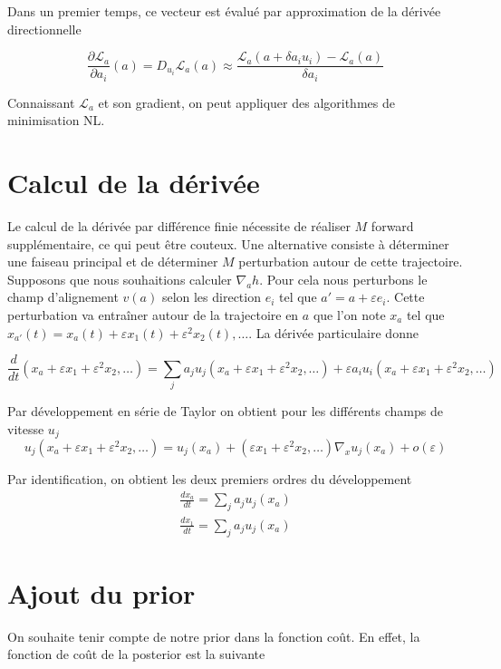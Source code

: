 \documentclass{article}
\begin{document}
Dans un premier temps, ce vecteur est évalué par approximation de la dérivée directionnelle

\begin{equation*}
    \frac{\partial \mathcal L_a}{\partial a_i}(a) = D_{u_i} \mathcal L_a(a) \approx \frac{\mathcal L_a(a + \delta a_i u_i) - \mathcal L_a(a)}{\delta a_i}
\end{equation*}

Connaissant $\mathcal L_a$ et son gradient, on peut appliquer des algorithmes de minimisation NL.

\section{Calcul de la dérivée}

Le calcul de la dérivée par différence finie nécessite de réaliser $M$ forward supplémentaire, ce qui peut être couteux. Une alternative consiste à déterminer une faiseau principal et de déterminer $M$ perturbation autour de cette trajectoire. Supposons que nous souhaitions calculer $\nabla_a h$. Pour cela nous perturbons le champ d'alignement $v(a)$ selon les direction $e_i$ tel que $a' = a + \varepsilon e_i$. Cette perturbation va entraîner autour de la trajectoire en $a$ que l'on note $x_a$ tel que $x_{a'}(t) = x_a(t) + \varepsilon x_1(t) + \varepsilon^2 x_2(t), \dots$.
La dérivée particulaire donne

\begin{equation*}
    \frac{d}{dt}(x_a + \varepsilon x_1 + \varepsilon^2 x_2, \dots) = \sum_j a_j u_j(x_a + \varepsilon x_1 + \varepsilon^2 x_2, \dots) + \varepsilon a_i u_i (x_a + \varepsilon x_1 + \varepsilon^2 x_2, \dots)
\end{equation*}

Par développement en série de Taylor on obtient pour les différents champs de vitesse $u_j$
\begin{equation*}
    u_j(x_a + \varepsilon x_1 + \varepsilon^2 x_2, \dots) = u_j(x_a) + (\varepsilon x_1 + \varepsilon^2 x_2, \dots) \nabla_x u_j (x_a) + o(\varepsilon)
\end{equation*}

Par identification, on obtient les deux premiers ordres du développement
\begin{eqnarray*}
    \frac{dx_a}{dt} = \sum_j a_j u_j(x_a) \\
    \frac{dx_1}{dt} = \sum_j a_j u_j(x_a)
\end{eqnarray*}

\section{Ajout du prior}
On souhaite tenir compte de notre prior dans la fonction coût. En effet, la fonction de coût de la posterior est la suivante
\end{document}
